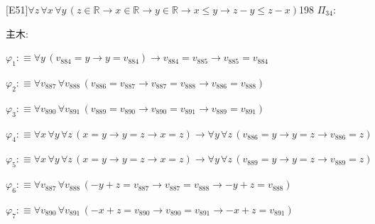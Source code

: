 \begin{fullproof}{[E51]}{$\forall z\,\forall x\,\forall y\,(z \in \mathbb{R} \to x \in \mathbb{R} \to y \in \mathbb{R} \to x \leq y \to z - y \leq z - x)$}{198}
\noindent$\Pi_{34}$:
\begin{ptree}
\noLine
{}
\noLine
{}
\noLine
{}
\end{ptree}
\noindent 主木:
\begin{ptree}
\noLine
{}
\end{ptree}
\begin{abbrevlist}
\item $\varphi_{1} :\equiv \forall y\,(v_{884} = y \to y = v_{884}) \to v_{884} = v_{885} \to v_{885} = v_{884}$
\item $\varphi_{2} :\equiv \forall v_{887}\,\forall v_{888}\,(v_{886} = v_{887} \to v_{887} = v_{888} \to v_{886} = v_{888})$
\item $\varphi_{3} :\equiv \forall v_{890}\,\forall v_{891}\,(v_{889} = v_{890} \to v_{890} = v_{891} \to v_{889} = v_{891})$
\item $\varphi_{4} :\equiv \forall x\,\forall y\,\forall z\,(x = y \to y = z \to x = z) \to \forall y\,\forall z\,(v_{886} = y \to y = z \to v_{886} = z)$
\item $\varphi_{5} :\equiv \forall x\,\forall y\,\forall z\,(x = y \to y = z \to x = z) \to \forall y\,\forall z\,(v_{889} = y \to y = z \to v_{889} = z)$
\item $\varphi_{6} :\equiv \forall v_{887}\,\forall v_{888}\,(-y + z = v_{887} \to v_{887} = v_{888} \to -y + z = v_{888})$
\item $\varphi_{7} :\equiv \forall v_{890}\,\forall v_{891}\,(-x + z = v_{890} \to v_{890} = v_{891} \to -x + z = v_{891})$

\end{abbrevlist}
\end{fullproof}
